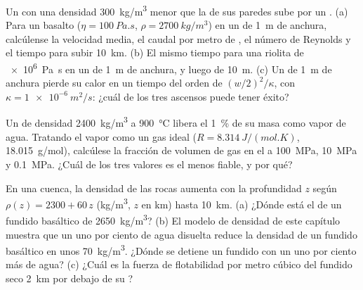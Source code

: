 \begin{exercise}[$\star\star$]\label{exo:b2:magma-emplacement:6}
Un  con una densidad \qty{300}{kg/m^3} menor que la de sus paredes sube por un .
(a) Para un basalto ($\eta = \qty{100}{Pa.s}$, $\rho = \qty{2700}{kg/m^3}$) en un 
de \qty{1}{m} de anchura, calcúlense la velocidad media, el caudal por metro de , el
número de Reynolds y el tiempo para subir \qty{10}{km}. (b) El mismo tiempo para una riolita de
\qty{e6}{Pa.s} en un  de \qty{1}{m} de anchura, y luego de \qty{10}{m}. (c) Un 
de \qty{1}{m} de anchura pierde su calor en un tiempo del orden de $(w/2)^2/\kappa$, con $\kappa =
\qty{1e-6}{m^2/s}$: ¿cuál de los tres ascensos puede tener éxito?
\end{exercise}

\begin{exercise}[$\star\star$]\label{exo:b2:magma-emplacement:7}
Un  de densidad \qty{2400}{kg/m^3} a \qty{900}{\celsius} libera el
\qty{1}{\percent} de su masa como vapor de agua. Tratando el vapor como un gas ideal
($R = \qty{8.314}{J/(mol.K)}$, \qty{18.015}{g/mol}), calcúlese la fracción de volumen de
gas en el  a \qty{100}{MPa}, \qty{10}{MPa} y \qty{0.1}{MPa}. ¿Cuál de los
tres valores es el menos fiable, y por qué?
\end{exercise}

\begin{exercise}[$\star\star$]\label{exo:b2:magma-emplacement:8}
En una cuenca, la densidad de las rocas aumenta con la profundidad $z$ según $\rho(z) =
2300 + 60\,z$ (\unit{kg/m^3}, $z$ en \unit{km}) hasta \qty{10}{km}. (a) ¿Dónde está
el  de un fundido basáltico de \qty{2650}{kg/m^3}? (b) El
modelo de densidad de este capítulo muestra que un uno por ciento de agua disuelta reduce
la densidad de un fundido basáltico en unos \qty{70}{kg/m^3}. ¿Dónde se detiene un fundido con
un uno por ciento más de agua? (c) ¿Cuál es la fuerza de flotabilidad por metro cúbico
del fundido seco \qty{2}{km} por debajo de su ?
\end{exercise}

